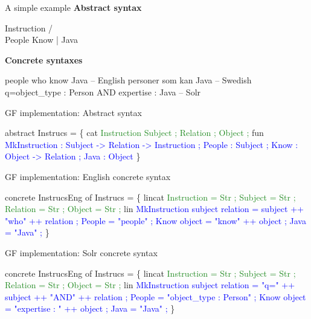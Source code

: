\begin{frame}[fragile]{A simple example}
\textbf{Abstract syntax}
\begin{semiverbatim}
    Instruction
   /           \\
People        Know
                |
              Java
\end{semiverbatim}\pause

\textbf{Concrete syntaxes}
\begin{semiverbatim}
people who know Java                           -- English
personer som kan Java                          -- Swedish
q=object_type : Person AND expertise : Java    -- Solr
\end{semiverbatim}
\end{frame}

\begin{frame}[fragile]{GF implementation: Abstract syntax}\pause
\begin{semiverbatim}
abstract Instrucs = \{
  cat \textcolor{ForestGreen}{
    Instruction 
    Subject ;
    Relation ;
    Object ; }\pause
  fun \textcolor{Blue}{
    MkInstruction : Subject -> Relation -> Instruction ;
    People : Subject ;
    Know : Object -> Relation ;
    Java : Object }
\}
\end{semiverbatim}
\end{frame}

\begin{frame}[fragile]{GF implementation: English concrete syntax}\pause
\begin{semiverbatim}
concrete InstrucsEng of Instrucs = \{
  lincat \textcolor{ForestGreen}{
    Instruction = \textcolor{Type}{Str} ;
    Subject = \textcolor{Type}{Str} ;
    Relation = \textcolor{Type}{Str} ;
    Object = \textcolor{Type}{Str} ; }\pause
  lin \textcolor{Blue}{
    MkInstruction subject relation = 
                   subject ++ \textcolor{String}{"who"} ++ relation ;
    People = \textcolor{String}{"people"} ;
    Know object = \textcolor{String}{"know"} ++ object ;
    Java = \textcolor{String}{"Java"} ; }
\}
\end{semiverbatim}
\end{frame}

\begin{frame}[fragile]{GF implementation: Solr concrete syntax}\pause
\begin{semiverbatim}
concrete InstrucsEng of Instrucs = \{
  lincat \textcolor{ForestGreen}{
    Instruction = \textcolor{Type}{Str} ;
    Subject = \textcolor{Type}{Str} ;
    Relation = \textcolor{Type}{Str} ;
    Object = \textcolor{Type}{Str} ;}\pause
  lin \textcolor{Blue}{
    MkInstruction subject relation = 
                   \textcolor{String}{"q="} ++ subject ++ \textcolor{String}{"AND"} ++ relation ;
    People = \textcolor{String}{"object_type : Person"} ;
    Know object = \textcolor{String}{"expertise : "} ++ object ;
    Java = \textcolor{String}{"Java"} ; }
\}
\end{semiverbatim}
\end{frame}

